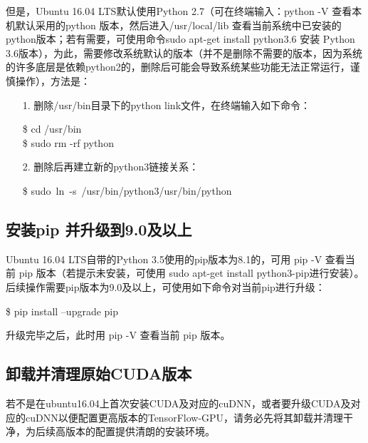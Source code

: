 \documentclass[11pt,a4paper]{ctexart}
\begin{document}
但是，Ubuntu 16.04 LTS默认使用Python 2.7（可在终端输入：python -V 查看本机默认采用的python 版本，然后进入/usr/local/lib 查看当前系统中已安装的python版本；若有需要，可使用命令sudo apt-get install python3.6 安装 Python 3.6版本），为此，需要修改系统默认的版本（并不是删除不需要的版本，因为系统的许多底层是依赖python2的，删除后可能会导致系统某些功能无法正常运行，谨慎操作），方法是：
\begin{itemize}
\item[1.] 删除/usr/bin目录下的python link文件，在终端输入如下命令：
\vspace{-0.3cm}
\begin{center}
\$ cd /usr/bin \\
\$ sudo rm -rf python
\end{center}

\item[2.] 删除后再建立新的python3链接关系：
\vspace{-0.3cm}
\begin{center}
\$ sudo\ ln\ -s\ /usr/bin/python3\quad   /usr/bin/python
\end{center}
\end{itemize}


\subsection{安装pip 并升级到9.0及以上}
Ubuntu 16.04 LTS自带的Python 3.5使用的pip版本为8.1的，可用 pip -V 查看当前 pip 版本（若提示未安装，可使用 sudo apt-get install python3-pip进行安装）。后续操作需要pip版本为9.0及以上，可使用如下命令对当前pip进行升级：
\vspace{-0.3cm}
\begin{center}
\$ pip install --upgrade pip
\end{center}
升级完毕之后，此时用 pip -V 查看当前 pip 版本。

\subsection{卸载并清理原始CUDA版本}
若不是在ubuntu16.04上首次安装CUDA及对应的cuDNN，或者要升级CUDA及对应的cuDNN以便配置更高版本的TensorFlow-GPU，请务必先将其卸载并清理干净，为后续高版本的配置提供清朗的安装环境。
\end{document}
